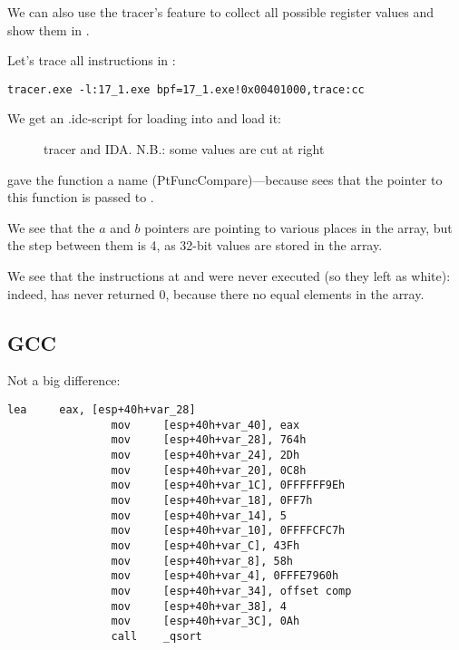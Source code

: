We can also use the tracer's feature to collect all possible register values and show them in \IDA.

Let's trace all instructions in \comp:

\begin{lstlisting}
tracer.exe -l:17_1.exe bpf=17_1.exe!0x00401000,trace:cc
\end{lstlisting}

We get an .idc-script for loading into \IDA and load it:

\begin{figure}[H]
\centering
{}
\caption{tracer and IDA. N.B.: 
some values are cut at right}
\label{fig:qsort_tracer_cc}
\end{figure}

\IDA gave the function a name (PtFuncCompare)---because \IDA sees that the pointer to this function is passed to \qsort.

We see that the $a$ and $b$ pointers are pointing to various places in the array, but the step between
them is 4, as 32-bit values are stored in the array.

We see that the instructions at  and  were never executed (so they left as white): 
indeed, \comp has never returned 0, because there no equal elements in the array.

\subsection{GCC}

Not a big difference:

\begin{lstlisting}[caption=GCC,style=customasmx86]
                lea     eax, [esp+40h+var_28]
                mov     [esp+40h+var_40], eax
                mov     [esp+40h+var_28], 764h
                mov     [esp+40h+var_24], 2Dh
                mov     [esp+40h+var_20], 0C8h
                mov     [esp+40h+var_1C], 0FFFFFF9Eh
                mov     [esp+40h+var_18], 0FF7h
                mov     [esp+40h+var_14], 5
                mov     [esp+40h+var_10], 0FFFFCFC7h
                mov     [esp+40h+var_C], 43Fh
                mov     [esp+40h+var_8], 58h
                mov     [esp+40h+var_4], 0FFFE7960h
                mov     [esp+40h+var_34], offset comp
                mov     [esp+40h+var_38], 4
                mov     [esp+40h+var_3C], 0Ah
                call    _qsort
\end{lstlisting}


